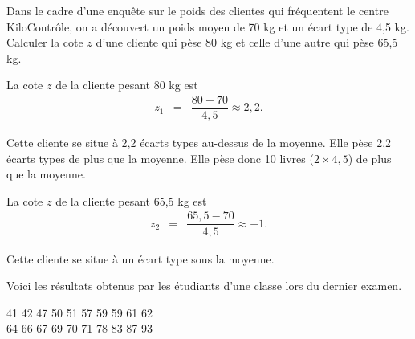 \documentclass[12pt]{exam}
\theoremstyle{definition}       %
\begin{document}
\begin{questions}
\bigskip

\question Dans le cadre d’une enquête sur le poids des clientes qui fréquentent le centre KiloContrôle, on a découvert un poids moyen de 70 kg et un écart type de 4,5 kg.  Calculer la cote $z$ d’une cliente qui pèse 80 kg et celle d’une autre qui pèse 65,5 kg. 

\begin{solution}
La cote $z$ de la cliente pesant 80 kg est 
\begin{eqnarray*}
z_{1}&=&\dfrac{80-70}{4,5}\approx 2,2.
\end{eqnarray*}

Cette cliente se situe à 2,2 écarts types au-dessus de la moyenne. Elle pèse 2,2 écarts types de plus que la moyenne. Elle pèse donc 10 livres ($2\times 4,5$) de plus que la moyenne.
\vspace{0.2cm}

La cote $z$ de la cliente pesant 65,5 kg est 
\begin{eqnarray*}
z_{2}&=&\dfrac{65,5-70}{4,5}\approx -1.
\end{eqnarray*}

Cette cliente se situe à un écart type sous la moyenne.

\end{solution}

\bigskip

\question Voici les résultats obtenus par les étudiants d’une classe lors du dernier examen.

41 \hspace{0.2cm} 42 \hspace{0.2cm} 47 \hspace{0.2cm} 50 \hspace{0.2cm} 51 \hspace{0.2cm} 57 \hspace{0.2cm} 59 \hspace{0.2cm} 59 \hspace{0.2cm} 61  \hspace{0.2cm} 62\\ 
64 \hspace{0.2cm} 66 \hspace{0.2cm} 67 \hspace{0.2cm} 69 \hspace{0.2cm} 70 \hspace{0.2cm} 71 \hspace{0.2cm} 78 \hspace{0.2cm} 83 \hspace{0.2cm} 87 \hspace{0.2cm} 93 


\end{questions}
\end{document}
